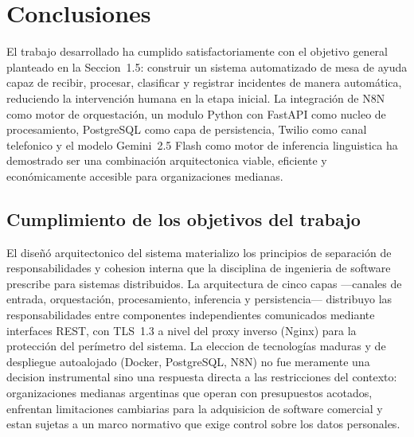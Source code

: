\section{Conclusiones}

El trabajo desarrollado ha cumplido satisfactoriamente con el objetivo general planteado en la Seccion~1.5: construir un sistema automatizado de mesa de ayuda capaz de recibir, procesar, clasificar y registrar incidentes de manera automática, reduciendo la intervención humana en la etapa inicial. La integración de N8N como motor de orquestación, un modulo Python con FastAPI como nucleo de procesamiento, PostgreSQL como capa de persistencia, Twilio como canal telefonico y el modelo Gemini~2.5 Flash como motor de inferencia linguistica ha demostrado ser una combinación arquitectonica viable, eficiente y económicamente accesible para organizaciones medianas.

\subsection{Cumplimiento de los objetivos del trabajo}

El diseñó arquitectonico del sistema materializo los principios de separación de responsabilidades y cohesion interna que la disciplina de ingenieria de software prescribe para sistemas distribuidos. La arquitectura de cinco capas ---canales de entrada, orquestación, procesamiento, inferencia y persistencia--- distribuyo las responsabilidades entre componentes independientes comunicados mediante interfaces REST, con TLS~1.3 a nivel del proxy inverso (Nginx) para la protección del perímetro del sistema. La eleccion de tecnologías maduras y de despliegue autoalojado (Docker, PostgreSQL, N8N) no fue meramente una decision instrumental sino una respuesta directa a las restricciones del contexto: organizaciones medianas argentinas que operan con presupuestos acotados, enfrentan limitaciones cambiarias para la adquisicion de software comercial y estan sujetas a un marco normativo que exige control sobre los datos personales.

